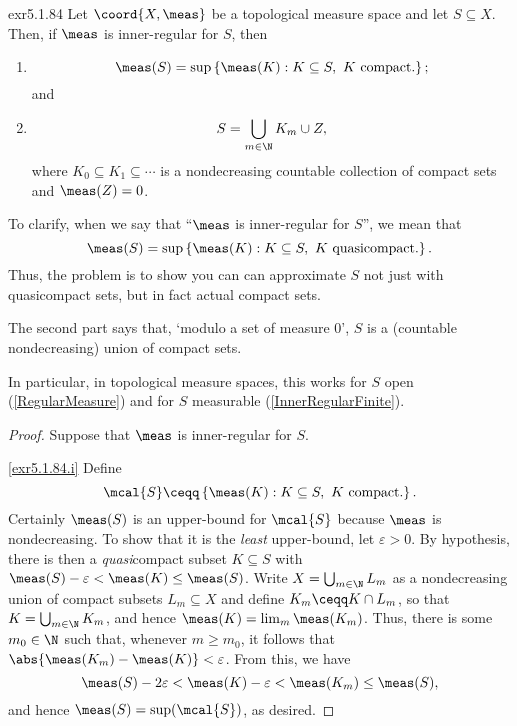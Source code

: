 \begin{prp}{}{exr5.1.84}
Let $\coord{X,\meas}$ be a topological measure space and let $S\subseteq X$.  Then, if $\meas$ is inner-regular for $S$, then
\begin{enumerate}
\item \label{exr5.1.84.i}
\begin{equation}
\meas (S)=\sup \left\{ \meas (K):K\subseteq S,\ K\text{ compact.}\right\} ;
\end{equation}
and
\item \label{exr5.1.84.ii}
\begin{equation}
S=\bigcup _{m\in \N}K_m\cup Z,
\end{equation}
where $K_0\subseteq K_1\subseteq \cdots$ is a nondecreasing countable collection of compact sets and $\meas (Z)=0$.
\end{enumerate}
\begin{rmk}
To clarify, when we say that ``$\meas$ is inner-regular for $S$'', we mean that
\begin{equation*}
\meas (S)=\sup \left\{ \meas (K):K\subseteq S,\ K\text{ quasicompact.}\right\} .
\end{equation*}
Thus, the problem is to show you can can approximate $S$ not just with quasicompact sets, but in fact actual compact sets.
\end{rmk}
\begin{rmk}
The second part says that, `modulo a set of measure $0$', $S$ is a (countable nondecreasing) union of compact sets. 
\end{rmk}
\begin{rmk}
In particular, in topological measure spaces, this works for $S$ open (\cref{RegularMeasure}) and for $S$ measurable (\cref{InnerRegularFinite}).
\end{rmk}
\begin{proof}
Suppose that $\meas$ is inner-regular for $S$.

\cref{exr5.1.84.i} Define
\begin{equation}
\mcal{S}\ceqq \left\{ \meas (K):K\subseteq S,\ K\text{ compact.}\right\} .
\end{equation}
Certainly $\meas (S)$ is an upper-bound for $\mcal{S}$ because $\meas$ is nondecreasing.  To show that it is the \emph{least} upper-bound, let $\varepsilon >0$.  By hypothesis, there is then a \emph{quasi}compact subset $K\subseteq S$ with $\meas (S)-\varepsilon <\meas (K)\leq \meas (S)$.  Write $X=\bigcup _{m\in \N}L_m$ as a nondecreasing union of compact subsets $L_m\subseteq X$ and define $K_m\ceqq K\cap L_m$, so that $K=\bigcup _{m\in \N}K_m$, and hence $\meas (K)=\lim _m\meas (K_m)$.  Thus, there is some $m_0\in \N$ such that, whenever $m\geq m_0$, it follows that $\abs{\meas (K_m)-\meas (K)}<\varepsilon$.  From this, we have
\begin{equation}
\meas (S)-2\varepsilon <\meas (K)-\varepsilon <\meas (K_m)\leq \meas (S),
\end{equation}
and hence $\meas (S)=\sup (\mcal{S})$, as desired.


\end{proof}
\end{prp}
